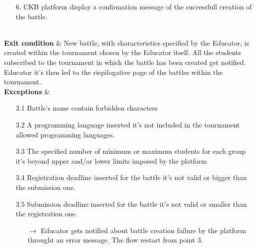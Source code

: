 \documentclass{article}
\begin{document}
{\begin{enumerate}
\begin{xltabular}{\textwidth}
\begin{enumerate}
                                                        \item[6.] CKB platform display a confirmation message of the successfull
                                                        creation of the battle.
                                                    \end{enumerate} \\
                        \hline
                        \textbf{Exit condition} & New battle, with characteristics specified by the Educator,
                         is created within the tournament chosen by the Educator itself. All the students subscribed to the tournament
                         in which the battle has been created get notified. Educator it's then led to the riepilogative
                         page of the battles within the tournament.
                         \\
                        \hline
                        \textbf{Exceptions} &    \begin{itemize}
                                                    \item[3.1] Battle's name contain forbidden characters
                                                    \item[3.2] A programming language inserted it's not included in the tournament
                                                    allowed programming languages.
                                                    \item[3.3] The specified number of minimum or maximum students for each group
                                                    it's beyond upper and/or lower limits imposed by the platform
                                                    \item[3.4] Registration deadline inserted for the battle it's not valid or
                                                    bigger than the submission one.
                                                    \item[3.5] Submission deadline inserted for the battle it's not valid or 
                                                    smaller than the registration one.
                                                    \begin{itemize}
                                                        \item[$\rightarrow$] Educator gets notified about battle creation failure
                                                        by the platform throught an error message. The flow restart from point 3.
                                                    \end{itemize} 
                                                \end{itemize}
                    \end{xltabular}
                    

\end{enumerate}}
\end{document}
